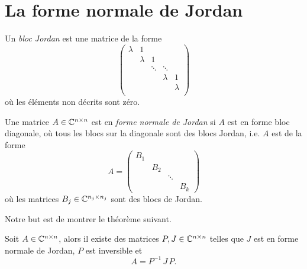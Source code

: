 \section{La forme normale de Jordan}
\label{sec:la-forme-normale}



\begin{definition}
  Un \emph{bloc Jordan} est une matrice de la forme 
  \begin{displaymath}
    \begin{pmatrix}
      λ & 1 \\
        & λ & 1 \\
        &   & \ddots & \ddots \\ 
        &   &             & λ & 1 \\
        &   &         &  & λ  \\
    \end{pmatrix}
  \end{displaymath}
où les éléments non décrits sont zéro. 

Une matrice $A \in \mathbb{C}^{n \times n}$ est en \emph{forme normale de Jordan} si $A$ est en forme bloc diagonale, où tous les blocs sur la diagonale sont des blocs Jordan, i.e. $A$ est de la forme
\begin{displaymath}
  A =
  \begin{pmatrix}
    B_1 \\
        & B_2 \\
        &    & \ddots \\
        &    &       & B_k
  \end{pmatrix}
\end{displaymath}
où les matrices $B_j \in \mathbb{C}^{n_j\times n_j}$ sont des blocs de Jordan. 
\end{definition}


Notre but est de montrer le théorème suivant. 

\begin{theorem}
  \label{thr:41}
  Soit $A \in \mathbb{C}^{n \times n}$, alors il existe des matrices $P,J \in \mathbb{C}^{n \times n}$ telles que $J$ est en forme normale de Jordan, $P$ est inversible et 
  \begin{displaymath}
    A = P^{-1} \,J \,P. 
  \end{displaymath}
\end{theorem}

